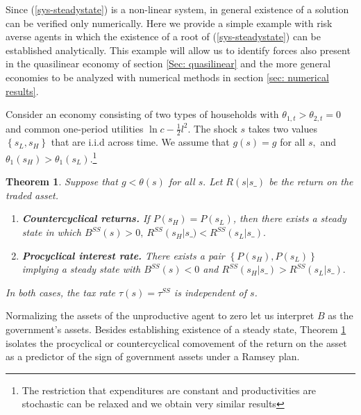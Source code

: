 \documentclass[thmsb,11pt]{article}
\newtheorem{theorem}{Theorem}
\begin{document}
Since  (\ref{sys-steadystate}) is a non-linear system, in general existence of a solution can   be verified only numerically.
      Here we provide a simple example with risk averse agents in which the existence of a root of (\ref{sys-steadystate}) can be established analytically. This example will allow us to identify forces also present in the quasilinear economy
of section \ref{Sec: quasilinear} and  the more general economies to be analyzed with numerical methods in section \ref{sec: numerical results}.

Consider an economy consisting of  two types of households with $%
\theta _{1,t}>\theta _{2,t}=0$ and common one-period utilities  $\ln c-\frac{1}{2}%
l^{2}.$ The shock $s$  takes  two values$ \left\{
s_{L},s_{H}\right\} $ that are i.i.d across time.  We assume that $g\left( s\right) =g$ for all $s,$
and $\theta _{1}\left( s_{H}\right) >\theta _{1}\left( s_{L}\right) .$\footnote{The restriction that expenditures are constant and productivities are stochastic can be relaxed and we obtain very similar results}
\smallskip

\begin{theorem}
\label{thm long run forces}\smallskip Suppose that $g<\theta (s)$ for all $%
s.$ Let $R(s|s\_)$ be the return on the traded asset.

\begin{enumerate}
\item \textbf{Countercyclical returns.} If $P \left( s_{H}\right) =P\left( s_{L}\right)$, then
there exists a steady state in which
$B^{SS}(s)>0,\ R^{SS}\left( s_{H}\right|s\_) <R^{SS}\left( s_{L}|s\_\right) .$
\item \textbf{Procyclical interest rate.} There exists a pair  $\left\{ P \left( s_{H}\right) ,P\left( s_{L}\right)
\right\} $ implying a steady state with $B^{SS}(s)<0$ and  $R^{SS}\left( s_{H}|s\_\right) >R^{SS}\left( s_{L}|s\_\right) .$
\end{enumerate}
In both cases, the tax rate $\tau(s)=\tau^{SS}$ is independent of $s$.
\end{theorem}



Normalizing the assets of the unproductive agent to zero %
let us  interpret $B$ as the government's assets.
Besides establishing existence of a steady state, Theorem \ref{thm long run forces}
isolates the procyclical or countercyclical comovement of the return on the asset as a predictor of  the sign of government assets under a Ramsey plan.
\end{document}
